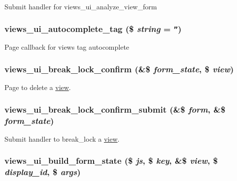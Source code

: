 Submit handler for views\_\-ui\_\-analyze\_\-view\_\-form \hypertarget{admin_8inc_1a3a91dbf973532f39cee36c1d99c87b}{
\subsubsection[{views\_\-ui\_\-autocomplete\_\-tag}]{\setlength{\rightskip}{0pt plus 5cm}views\_\-ui\_\-autocomplete\_\-tag (\$ {\em string} = {\tt ''})}}
\label{admin_8inc_1a3a91dbf973532f39cee36c1d99c87b}


Page callback for views tag autocomplete \hypertarget{admin_8inc_d33727efc8afa8203a7e81ce6a4675a6}{
\subsubsection[{views\_\-ui\_\-break\_\-lock\_\-confirm}]{\setlength{\rightskip}{0pt plus 5cm}views\_\-ui\_\-break\_\-lock\_\-confirm (\&\$ {\em form\_\-state}, \/  \$ {\em view})}}
\label{admin_8inc_d33727efc8afa8203a7e81ce6a4675a6}


Page to delete a \hyperlink{classview}{view}. \hypertarget{admin_8inc_c4e4cf7b38cbca3119949d164226ab93}{
\subsubsection[{views\_\-ui\_\-break\_\-lock\_\-confirm\_\-submit}]{\setlength{\rightskip}{0pt plus 5cm}views\_\-ui\_\-break\_\-lock\_\-confirm\_\-submit (\&\$ {\em form}, \/  \&\$ {\em form\_\-state})}}
\label{admin_8inc_c4e4cf7b38cbca3119949d164226ab93}


Submit handler to break\_\-lock a \hyperlink{classview}{view}. \hypertarget{admin_8inc_fc1eec863da7b425bae3b0509fe17e4d}{
\subsubsection[{views\_\-ui\_\-build\_\-form\_\-state}]{\setlength{\rightskip}{0pt plus 5cm}views\_\-ui\_\-build\_\-form\_\-state (\$ {\em js}, \/  \$ {\em key}, \/  \&\$ {\em view}, \/  \$ {\em display\_\-id}, \/  \$ {\em args})}}
\label{admin_8inc_fc1eec863da7b425bae3b0509fe17e4d}



